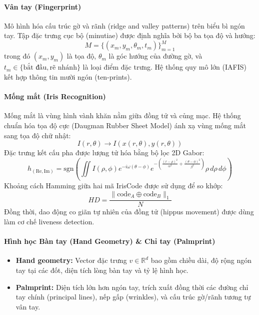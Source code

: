 \paragraph{Vân tay (Fingerprint)}
Mô hình hóa cấu trúc gờ và rãnh (ridge and valley patterns) trên biểu bì ngón tay. Tập đặc trưng cục bộ (minutiae) được định nghĩa bởi bộ ba tọa độ và hướng:
\begin{equation}
    M = \{ (x_m, y_m, \theta_m, t_m) \}_{m=1}^M
\end{equation}
trong đó $(x_m, y_m)$ là tọa độ, $\theta_m$ là góc hướng của đường gờ, và $t_m \in \{\text{bắt đầu}, \text{rẽ nhánh}\}$ là loại điểm đặc trưng. Hệ thống quy mô lớn (IAFIS) kết hợp thông tin mười ngón (ten-prints).

\paragraph{Mống mắt (Iris Recognition)}
Mống mắt là vùng hình vành khăn nằm giữa đồng tử và củng mạc. Hệ thống chuẩn hóa tọa độ cực (Daugman Rubber Sheet Model) ánh xạ vùng mống mắt sang tọa độ chữ nhật:
\begin{equation}
    I(r, \theta) \rightarrow I(x(r, \theta), y(r, \theta))
\end{equation}
Đặc trưng kết cấu pha được lượng tử hóa bằng bộ lọc 2D Gabor:
\begin{equation}
    h_{(\text{Re}, \text{Im})} = \text{sgn} \left( \iint I(\rho, \phi) e^{-i \omega (\theta - \phi)} e^{-\left( \frac{(r - \rho)^2}{\alpha^2} + \frac{(\theta - \phi)^2}{\beta^2} \right)} \rho \, d\rho \, d\phi \right)
\end{equation}
Khoảng cách Hamming giữa hai mã IrisCode được sử dụng để so khớp:
\begin{equation}
    HD = \frac{\| \text{code}_A \oplus \text{code}_B \|_1}{N}
\end{equation}
Đồng thời, dao động co giãn tự nhiên của đồng tử (hippus movement) được dùng làm cơ chế liveness detection.

\paragraph{Hình học Bàn tay (Hand Geometry) \& Chỉ tay (Palmprint)}
\begin{itemize}
    \item \textbf{Hand geometry:} Vector đặc trưng $v \in \mathbb{R}^d$ bao gồm chiều dài, độ rộng ngón tay tại các đốt, diện tích lòng bàn tay và tỷ lệ hình học.
    \item \textbf{Palmprint:} Diện tích lớn hơn ngón tay, trích xuất đồng thời các đường chỉ tay chính (principal lines), nếp gấp (wrinkles), và cấu trúc gờ/rãnh tương tự vân tay.
\end{itemize}

